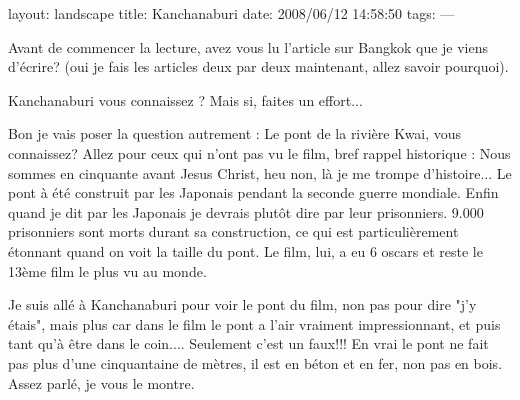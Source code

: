 layout: landscape
title: Kanchanaburi
date: 2008/06/12 14:58:50
tags:
---

Avant de commencer la lecture, avez vous lu l'article sur Bangkok que je viens d'écrire? (oui je fais les articles deux par deux maintenant, allez savoir pourquoi).

Kanchanaburi vous connaissez ? Mais si, faites un effort...

Bon je vais poser la question autrement : Le pont de la rivière Kwai, vous connaissez? Allez pour ceux qui n'ont pas vu le film, bref rappel historique : Nous sommes en cinquante avant Jesus Christ, heu non, là je me trompe d'histoire... Le pont à été construit par les Japonais pendant la seconde guerre mondiale. Enfin quand je dit par les Japonais je devrais plutôt dire par leur prisonniers. 9.000 prisonniers sont morts durant sa construction, ce qui est particulièrement étonnant quand on voit la taille du pont. Le film, lui, a eu 6 oscars et reste le 13ème film le plus vu au monde.

Je suis allé à Kanchanaburi pour voir le pont du film, non pas pour dire "j'y étais", mais plus car dans le film le pont a l'air vraiment impressionnant, et puis tant qu'à être dans le coin.... Seulement c'est un faux!!! En vrai le pont ne fait pas plus d'une cinquantaine de mètres, il est en béton et en fer, non pas en bois. Assez parlé, je vous le montre.


